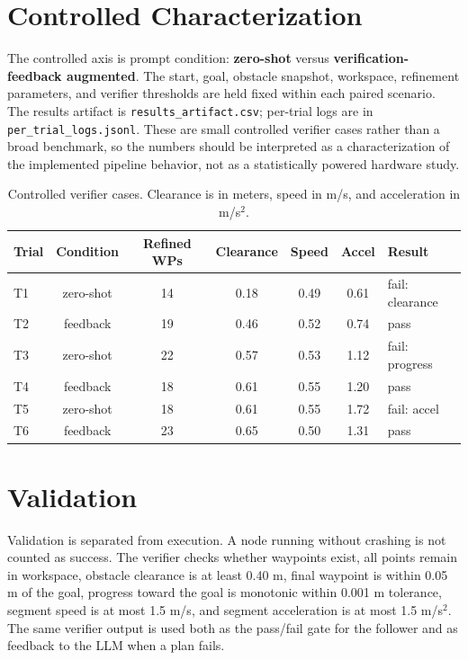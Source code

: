 \documentclass[12pt]{article}
\begin{document}
\section{Controlled Characterization}

The controlled axis is prompt condition: \textbf{zero-shot} versus \textbf{verification-feedback augmented}. The start, goal, obstacle snapshot, workspace, refinement parameters, and verifier thresholds are held fixed within each paired scenario. The results artifact is \texttt{results\_artifact.csv}; per-trial logs are in \texttt{per\_trial\_logs.jsonl}. These are small controlled verifier cases rather than a broad benchmark, so the numbers should be interpreted as a characterization of the implemented pipeline behavior, not as a statistically powered hardware study.

\begin{table}[h]
\centering
\small
\begin{tabular}{lcccccl}
\toprule
Trial & Condition & Refined WPs & Clearance & Speed & Accel & Result \\
\midrule
T1 & zero-shot & 14 & 0.18 & 0.49 & 0.61 & fail: clearance \\
T2 & feedback & 19 & 0.46 & 0.52 & 0.74 & pass \\
T3 & zero-shot & 22 & 0.57 & 0.53 & 1.12 & fail: progress \\
T4 & feedback & 18 & 0.61 & 0.55 & 1.20 & pass \\
T5 & zero-shot & 18 & 0.61 & 0.55 & 1.72 & fail: accel \\
T6 & feedback & 23 & 0.65 & 0.50 & 1.31 & pass \\
\bottomrule
\end{tabular}
\caption{Controlled verifier cases. Clearance is in meters, speed in m/s, and acceleration in m/s$^2$.}
\end{table}

\section{Validation}

Validation is separated from execution. A node running without crashing is not counted as success. The verifier checks whether waypoints exist, all points remain in workspace, obstacle clearance is at least 0.40 m, final waypoint is within 0.05 m of the goal, progress toward the goal is monotonic within 0.001 m tolerance, segment speed is at most 1.5 m/s, and segment acceleration is at most 1.5 m/s$^2$. The same verifier output is used both as the pass/fail gate for the follower and as feedback to the LLM when a plan fails.
\end{document}

